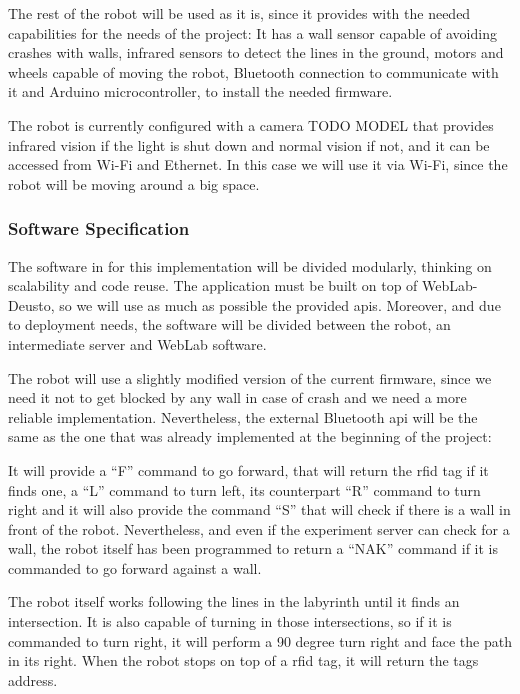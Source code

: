 The rest of the robot will be used as it is, since it provides with the needed capabilities for the
needs of the project: It has a wall sensor capable of avoiding crashes with walls, infrared sensors
to detect the lines in the ground, motors and wheels capable of moving the robot, Bluetooth
connection to communicate with it and Arduino microcontroller, to install the needed firmware.

The robot is currently configured with a camera {TODO MODEL} that provides infrared vision if the
light is shut down and normal vision if not, and it can be accessed from Wi-Fi and Ethernet. In this
case we will use it via Wi-Fi, since the robot will be moving around a big space.

\subsubsection{Software Specification}

The software in for this implementation will be divided modularly, thinking on scalability and
code reuse. The application must be built on top of WebLab-Deusto, so we will use as much as
possible the provided \acrshort{api}s. Moreover, and due to deployment needs, the software will be
divided between the robot, an intermediate server and WebLab software.

The robot will use a slightly modified version of the current firmware, since we need it not to get
blocked by any wall in case of crash and we need a more reliable implementation. Nevertheless, the
external Bluetooth \acrshort{api} will be the same as the one that was already implemented at the
beginning of the project:

It will provide a ``F'' command to go forward, that will return the \acrshort{rfid} tag if it finds
one, a ``L'' command to turn left, its counterpart ``R'' command to turn right and it will also
provide the command ``S'' that will check if there is a wall in front of the robot. Nevertheless,
and even if the experiment server can check for a wall, the robot itself has been programmed to
return a ``NAK'' command if it is commanded to go forward against a wall.

The robot itself works following the lines in the labyrinth until it finds an intersection. It is
also capable of turning in those intersections, so if it is commanded to turn right, it will perform
a 90 degree turn right and face the path in its right. When the robot stops on top of a
\acrshort{rfid} tag, it will return the tags address.

